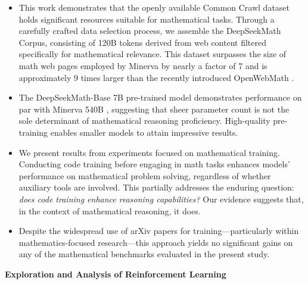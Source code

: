 \begin{itemize}[topsep=0pt]
    \item This work demonstrates that the openly available Common Crawl dataset holds significant resources suitable for mathematical tasks. Through a carefully crafted data selection process, we assemble the DeepSeekMath Corpus, consisting of 120B tokens derived from web content filtered specifically for mathematical relevance. This dataset surpasses the size of math web pages employed by Minerva \citep{minerva} by nearly a factor of 7 and is approximately 9 times larger than the recently introduced OpenWebMath \citep{openwebmath}.

\item The DeepSeekMath-Base 7B pre-trained model demonstrates performance on par with Minerva 540B \citep{minerva}, suggesting that sheer parameter count is not the sole determinant of mathematical reasoning proficiency. High-quality pre-training enables smaller models to attain impressive results.

\item We present results from experiments focused on mathematical training. Conducting code training before engaging in math tasks enhances models’ performance on mathematical problem solving, regardless of whether auxiliary tools are involved. This partially addresses the enduring question: \textit{does code training enhance reasoning capabilities?} Our evidence suggests that, in the context of mathematical reasoning, it does.

\item Despite the widespread use of arXiv papers for training—particularly within mathematics-focused research—this approach yields no significant gains on any of the mathematical benchmarks evaluated in the present study.
\end{itemize}

\textbf{Exploration and Analysis of Reinforcement Learning}

